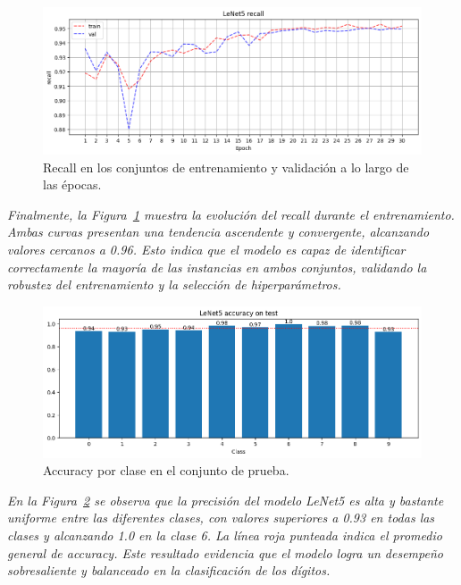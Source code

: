 \documentclass[conference]{IEEEtran}
\begin{document}
\begin{figure}[H]
    \centering
    \includegraphics[width=0.95\linewidth]{graphics-raw/raw-recall-train_val.png}
    \caption{Recall en los conjuntos de entrenamiento y validación a lo largo de las épocas.}
    \label{fig:raw-recall-train_val}
\end{figure}
\noindent\textit{
Finalmente, la Figura~\ref{fig:raw-recall-train_val} muestra la evolución del recall durante el entrenamiento. Ambas curvas presentan una tendencia ascendente y convergente, alcanzando valores cercanos a 0.96. Esto indica que el modelo es capaz de identificar correctamente la mayoría de las instancias en ambos conjuntos, validando la robustez del entrenamiento y la selección de hiperparámetros.
}


\begin{figure}[H]
    \centering
    \includegraphics[width=0.95\linewidth]{graphics-raw/raw-accuracy-test.png}
    \caption{Accuracy por clase en el conjunto de prueba.}
    \label{fig:raw-accuracy-test}
\end{figure}
\noindent\textit{
En la Figura~\ref{fig:raw-accuracy-test} se observa que la precisión del modelo LeNet5 es alta y bastante uniforme entre las diferentes clases, con valores superiores a 0.93 en todas las clases y alcanzando 1.0 en la clase 6. La línea roja punteada indica el promedio general de accuracy. Este resultado evidencia que el modelo logra un desempeño sobresaliente y balanceado en la clasificación de los dígitos.
}
\end{document}
